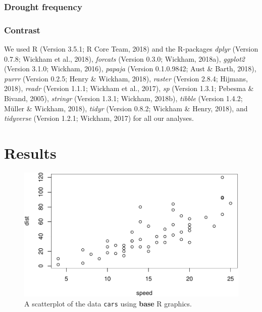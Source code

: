 \documentclass[man,floatsintext]{apa6}
\begin{document}
\hypertarget{drought-frequency}{%
\subsubsection{Drought frequency}\label{drought-frequency}}

\hypertarget{contrast}{%
\subsubsection{Contrast}\label{contrast}}

We used R (Version 3.5.1; R Core Team, 2018) and the R-packages
\emph{dplyr} (Version 0.7.8; Wickham et al., 2018), \emph{forcats}
(Version 0.3.0; Wickham, 2018a), \emph{ggplot2} (Version 3.1.0; Wickham,
2016), \emph{papaja} (Version 0.1.0.9842; Aust \& Barth, 2018),
\emph{purrr} (Version 0.2.5; Henry \& Wickham, 2018), \emph{raster}
(Version 2.8.4; Hijmans, 2018), \emph{readr} (Version 1.1.1; Wickham et
al., 2017), \emph{sp} (Version 1.3.1; Pebesma \& Bivand, 2005),
\emph{stringr} (Version 1.3.1; Wickham, 2018b), \emph{tibble} (Version
1.4.2; Müller \& Wickham, 2018), \emph{tidyr} (Version 0.8.2; Wickham \&
Henry, 2018), and \emph{tidyverse} (Version 1.2.1; Wickham, 2017) for
all our analyses.

\hypertarget{results}{%
\section{Results}\label{results}}




\begin{figure}[!h]
\includegraphics[width=\textwidth]{manuscript_files/figure-latex/foo-1} \caption{A scatterplot of the data \texttt{cars} using \textbf{base} R
graphics.}\label{fig:foo}
\end{figure}
\end{document}
